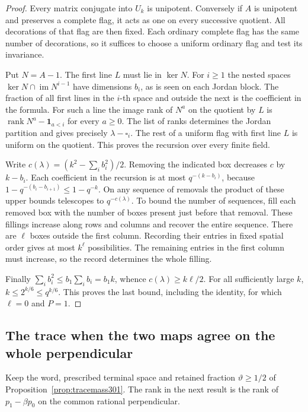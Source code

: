 \documentclass[a4paper,11pt]{article}
\theoremstyle{definition}
\theoremstyle{remark}
\numberwithin{equation}{section}
\begin{document}
\begin{proof}
Every matrix conjugate into \(U_k\) is unipotent. Conversely
if \(A\) is unipotent and preserves a complete flag, it acts
as one on every successive quotient. All decorations of that
flag are then fixed. Each ordinary complete flag has the
same number of decorations, so it suffices to choose a
uniform ordinary flag and test its invariance.

Put \(N=A-1\). The first line \(L\) must lie in \(\ker N\).
For \(i\ge1\) the nested spaces \(\ker N\cap\operatorname{im}
N^{i-1}\) have dimensions \(b_i\), as is seen on each Jordan
block. The fraction of all first lines in the \(i\)-th space
and outside the next is the coefficient in the formula.
For such a line the image rank of \(N^a\) on the quotient
by \(L\) is \(\operatorname{rank}N^a-\mathbf{1}_{a<i}\) for
every \(a\ge0\). The list of ranks determines the Jordan
partition and gives precisely \(\lambda-\square_i\). The
rest of a uniform flag with first line \(L\) is uniform
on the quotient. This proves the recursion over every
finite field.

Write \(c(\lambda)=(k^2-\sum_i b_i^2)/2\).
Removing the indicated box decreases \(c\) by \(k-b_i\).
Each coefficient in the recursion is at most \(q^{-(k-b_i)}\),
because \(1-q^{-(b_i-b_{i+1})}\le 1-q^{-k}\).
On any sequence of removals the product of these upper
bounds telescopes to \(q^{-c(\lambda)}\). To bound the
number of sequences, fill each removed box with the number
of boxes present just before that removal. These fillings
increase along rows and columns and recover the entire
sequence. There are \(\ell\) boxes outside the first column.
Recording their entries in fixed spatial order gives at
most \(k^\ell\) possibilities. The remaining entries in
the first column must increase, so the record determines
the whole filling.

Finally \(\sum_i b_i^2\le b_1\sum_i b_i=b_1 k\), whence
\(c(\lambda)\ge k\ell/2\). For all sufficiently large \(k\),
\(k\le 2^{k/6}\le q^{k/6}\). This proves the last bound,
including the identity, for which \(\ell=0\) and \(P=1\).
\end{proof}

\subsection{The trace when the two maps agree on the whole perpendicular}\label{nav:III-66}
Keep the word, prescribed terminal space and retained fraction
\(\vartheta\ge1/2\) of Proposition~\ref{prop:tracemass301}.
The rank in the next result is the rank of
\(p_1-\beta p_0\) on the common rational perpendicular.
\end{document}
